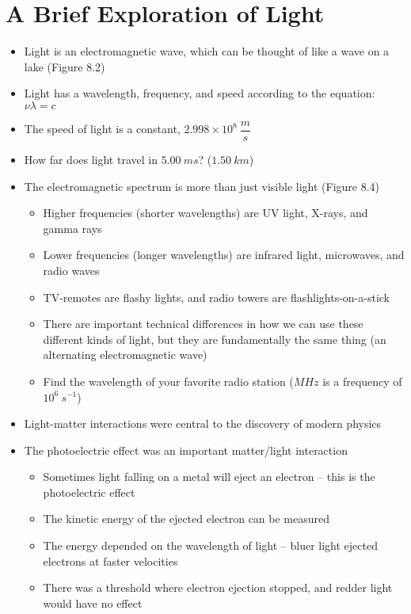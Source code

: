 \documentclass[12pt, openany, letterpaper]{memoir}
\begin{document}
\section{A Brief Exploration of Light}
\begin{itemize}
	\item Light is an electromagnetic wave, which can be thought of like a wave on a lake (Figure 8.2)
	\item Light has a wavelength, frequency, and speed according to the equation: $\nu\lambda=c$
	\item The speed of light is a constant, $2.998\times10^8~\dfrac{m}{s}$
	\item How far does light travel in $5.00~ms$? ($1.50~km$)
	\item The electromagnetic spectrum is more than just visible light (Figure 8.4)
	      \begin{itemize}
		      \item Higher frequencies (shorter wavelengths) are UV light, X-rays, and gamma rays
		      \item Lower frequencies (longer wavelengths) are infrared light, microwaves, and radio waves
		      \item TV-remotes are flashy lights, and radio towers are flashlights-on-a-stick
		      \item There are important technical differences in how we can use these different kinds of light, but they are fundamentally the same thing (an alternating electromagnetic wave)
		      \item Find the wavelength of your favorite radio station ($M\!H\!z$ is a frequency of $10^6~s^{-1}$)
	      \end{itemize}
	\item Light-matter interactions were central to the discovery of modern physics
	\item The photoelectric effect was an important matter/light interaction
	      \begin{itemize}
		      \item Sometimes light falling on a metal will eject an electron -- this is the photoelectric effect
		      \item The kinetic energy of the ejected electron can be measured
		      \item The energy depended on the wavelength of light -- bluer light ejected electrons at faster velocities
		      \item There was a threshold where electron ejection stopped, and redder light would have no effect

\end{itemize}
\end{itemize}
\end{document}
